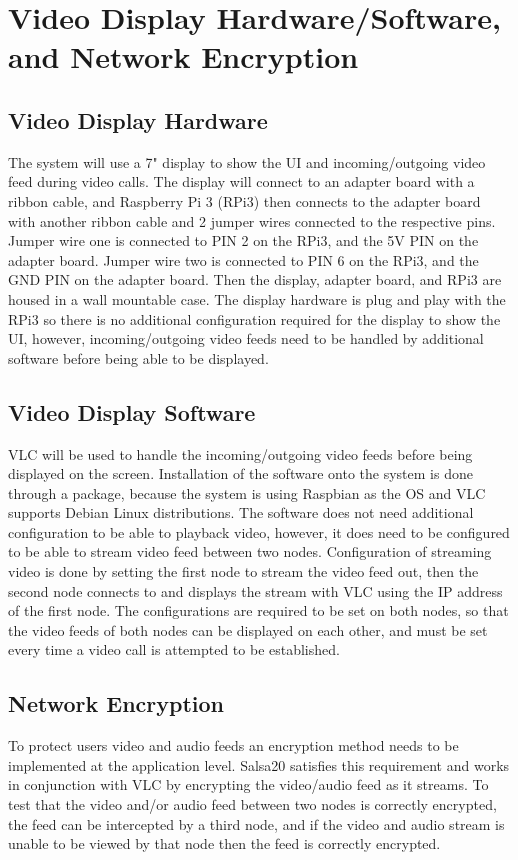 \documentclass[onecolumn, draftclsnofoot,10pt, compsoc]{IEEEtran}
\begin{document}
\clearpage

\section{Video Display Hardware/Software, and Network Encryption}


\subsection{Video Display Hardware}
The system will use a 7" display to show the UI and incoming/outgoing video feed during video calls. 
The display will connect to an adapter board with a ribbon cable, and Raspberry Pi 3 (RPi3) then connects to the adapter board with another ribbon cable and 2 jumper wires connected to the respective pins. 
Jumper wire one is connected to PIN 2 on the RPi3, and the 5V PIN on the adapter board. Jumper wire two is connected to PIN 6 on the RPi3, and the GND PIN on the adapter board. Then the display, adapter board, and RPi3 are housed in a wall mountable case. The display hardware is plug and play with the RPi3 so there is no additional configuration required for the display to show the UI, however,  incoming/outgoing video feeds need to be handled by additional software before being able to be displayed.


\subsection{Video Display Software}
VLC will be used to handle the incoming/outgoing video feeds before being displayed on the screen. 
Installation of the software onto the system is done through a package, because the system is using Raspbian as the OS and VLC supports Debian Linux distributions.
The software does not need additional configuration to be able to playback video, however, it does need to be configured to be able to stream video feed between two nodes. 
Configuration of streaming video is done by setting the first node to stream the video feed out, then the second node connects to and displays the stream with VLC using the IP address of the first node. 
The configurations are required to be set on both nodes, so that the video feeds of both nodes can be displayed on each other, and must be set every time a video call is attempted to be established.


\subsection{Network Encryption}
To protect users video and audio feeds an encryption method needs to be implemented at the application level. 
Salsa20 satisfies this requirement and works in conjunction with VLC by encrypting the video/audio feed as it streams.
To test that the video and/or audio feed between two nodes is correctly encrypted, the feed can be intercepted by a third node, and if the video and audio stream is unable to be viewed by that node then the feed is correctly encrypted.
\end{document}
